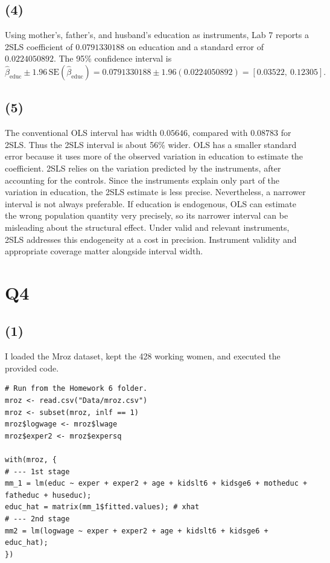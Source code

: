 \documentclass[11pt]{article}
\begin{document}
\subsection{(4)}
Using mother's, father's, and husband's education as instruments, Lab 7
reports a 2SLS coefficient of $0.0791330188$ on education and a standard
error of $0.0224050892$. The 95\% confidence interval is
\[
    \hat\beta_{\mathrm{educ}}\pm1.96\,\mathrm{SE}(\hat\beta_{\mathrm{educ}})
    =0.0791330188\pm1.96(0.0224050892)
    =\boxed{[0.03522,\ 0.12305]}.
\]

\subsection{(5)}
The conventional OLS interval has width $0.05646$, compared with $0.08783$
for 2SLS. Thus the 2SLS interval is about 56\% wider. OLS has a smaller
standard error because it uses more of the observed variation in education
to estimate the coefficient. 2SLS relies on the variation predicted by the
instruments, after accounting for the controls. Since the instruments
explain only part of the variation in education, the 2SLS estimate is less
precise. Nevertheless, a
narrower interval is not always preferable. If education is endogenous, OLS
can estimate the wrong population quantity very precisely, so its narrower
interval can be misleading about the structural effect. Under valid and
relevant instruments, 2SLS addresses this endogeneity at a cost in precision.
Instrument validity and appropriate coverage matter alongside interval width.

\clearpage
\section{Q4}
\label{sec:q4}
\subsection{(1)}
I loaded the Mroz dataset, kept the 428 working women, and executed the
provided code.
\begin{lstlisting}[style=Rcode]
# Run from the Homework 6 folder.
mroz <- read.csv("Data/mroz.csv")
mroz <- subset(mroz, inlf == 1)
mroz$logwage <- mroz$lwage
mroz$exper2 <- mroz$expersq

with(mroz, {
# --- 1st stage
mm_1 = lm(educ ~ exper + exper2 + age + kidslt6 + kidsge6 + motheduc + fatheduc + huseduc);
educ_hat = matrix(mm_1$fitted.values); # xhat
# --- 2nd stage
mm2 = lm(logwage ~ exper + exper2 + age + kidslt6 + kidsge6 + educ_hat);
})
\end{lstlisting}
\end{document}
